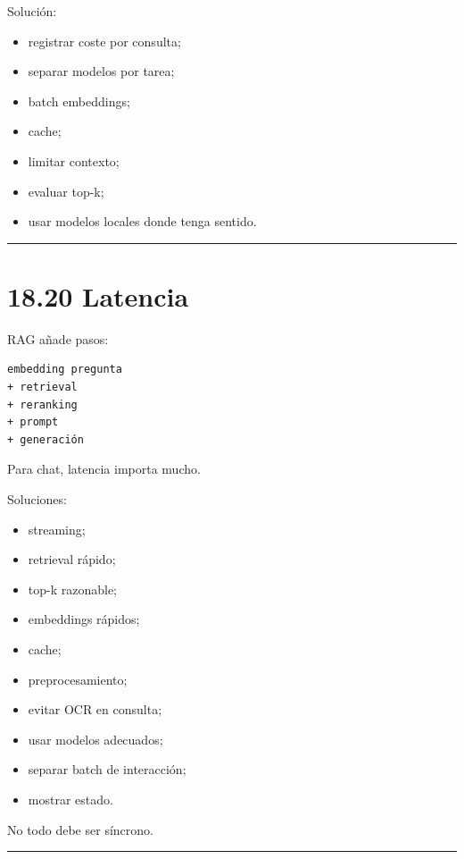 Solución:

\begin{itemize}
\tightlist
\item
  registrar coste por consulta;
\item
  separar modelos por tarea;
\item
  batch embeddings;
\item
  cache;
\item
  limitar contexto;
\item
  evaluar top-k;
\item
  usar modelos locales donde tenga sentido.
\end{itemize}

\begin{center}\rule{0.5\linewidth}{0.5pt}\end{center}

\section{18.20 Latencia}\label{latencia-4}

RAG añade pasos:

\begin{lstlisting}
embedding pregunta
+ retrieval
+ reranking
+ prompt
+ generación
\end{lstlisting}

Para chat, latencia importa mucho.

Soluciones:

\begin{itemize}
\tightlist
\item
  streaming;
\item
  retrieval rápido;
\item
  top-k razonable;
\item
  embeddings rápidos;
\item
  cache;
\item
  preprocesamiento;
\item
  evitar OCR en consulta;
\item
  usar modelos adecuados;
\item
  separar batch de interacción;
\item
  mostrar estado.
\end{itemize}

No todo debe ser síncrono.

\begin{center}\rule{0.5\linewidth}{0.5pt}\end{center}

